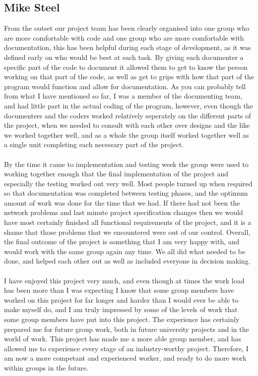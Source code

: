 \documentclass{project}
\begin{document}
\subsection{Mike Steel}
From the outset our project team has been clearly organised into one group who are more comfortable with code and one group who are more comfortable with documentation, this has been helpful during each stage of development, as it was defined early on who would be best at each task. By giving each documenter a specific part of the code to document it allowed them to get to know the person working on that part of the code, as well as get to grips with how that part of the program would function and allow for documentation. As you can probably tell from what I have mentioned so far, I was a member of the documenting team, and had little part in the actual coding of the program, however, even though the documenters and the coders worked relatively seperately on the different parts of the project, when we needed to consult with each other over designs and the like we worked together well, and as a whole the group itself worked together well as a single unit completing each necessary part of the project.
\\\\
By the time it came to implementation and testing week the group were used to working together enough that the final implementation of the project and especially the testing worked out very well. Most people turned up when required so that documentation was completed between testing phases, and the optimum amount of work was done for the time that we had. If there had not been the network problems and last minute project specification changes then we would have most certainly finished all functional requirements of the project, and it is a shame that those problems that we encountered were out of our control. Overall, the final outcome of the project is something that I am very happy with, and would work with the same group again any time. We all did what needed to be done, and helped each other out as well as included everyone in decision making.
\\\\
I have enjoyed this project very much, and even though at times the work load has been more than I was expecting I know that some group members have worked on this project for far longer and harder than I would ever be able to make myself do, and I am truly impressed by some of the levels of work that some group members have put into this project. The experience has certainly prepared me for future group work, both in future university projects and in the world of work. This project has made me a more able group member, and has allowed me to experience every stage of an industry-worthy project. Therefore, I am now a more competant and experienced worker, and ready to do more work within groups in the future.
\end{document}

